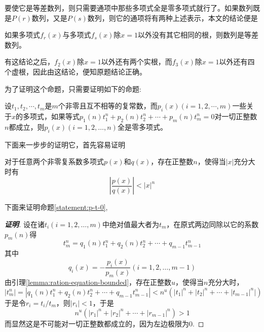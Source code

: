 \documentclass{ctexart}
\begin{document}
  要使它是等差数列，则只需要通项中那些多项式全是零多项式就行了。如果数列既是$P(r)$数列，又是$P(s)$数列，则它的通项将有两种上述表示，本文的结论便是
  \begin{statement}
    如果多项式$f_r(x)$与多项式$f_s(x)$除$x=1$以外没有其它相同的根，则数列是等差数列。
  \end{statement}
  有这结论之后，$f_2(x)$除$x=1$以外还有两个实根，而$f_3(x)$除$x=1$以外还有四个虚根，因此由这结论，便知原题结论正确。

  为了证明这个命题，只需要证明如下的命题:
\begin{statement}
  \label{statement:p-t-0}
    设$t_1,t_2,\cdots,t_m$是$m$个非零且互不相等的复常数，而$p_i(x)(i=1,2,\cdots,m)$一些关于$x$的多项式，如果等式$p_1(n)t_1^n+p_2(n)t_2^n+\cdots+p_m(n)t_m^n=0$对一切正整数$n$都成立，则$p_i(x)(i=1,2,\ldots,n)$全是零多项式。
\end{statement}

下面来一步步的证明它，首先容易证明
\begin{lemma}
  \label{lemma:ration-equation-bounded}
  对于任意两个非零复系数多项式$p(x)$和$q(x)$，存在正整数$n$，使得当$|x|$充分大时有
  \[ \left| \frac{p(x)}{q(x)} \right| < |x|^n \]
\end{lemma}

下面来证明命题\ref{statement:p-t-0},
\begin{proof}[\textbf{证明}]
  设在诸$t_i(i=1,2,\ldots,m)$中绝对值最大者为$t_m$，在原式两边同除以它的系数$p_m(n)$得
  \[ t_m^n = q_1(n)t_1^n+q_2(n)t_2^n+\cdots+q_{m-1}t_{m-1}^n \]
  其中
  \[ q_i(x) = - \frac{p_i(x)}{p_m(x)} (i=1,2,\ldots,m-1) \]
  由引理\ref{lemma:ration-equation-bounded}，存在正整数$u$，使得当$n$充分大时，
  \[ |t_m^n|=|q_1(n)t_1^n+q_2(n)t_2^n+\cdots+q_{m-1}t_{m-1}^n| < n^u(|t_1|^n+|t_2|^n+\cdots+|t_{m-1}|^n|) \]
  于是令$r_i=t_i/t_m$，则$|r_i| < 1$，于是
  \[ n^u(|r_1|^n+|r_2|^n+\cdots+|r_{m-1}|^n) > 1  \]
  而显然这是不可能对一切正整数都成立的，因为左边极限为0.
\end{proof}
 
\end{document}
